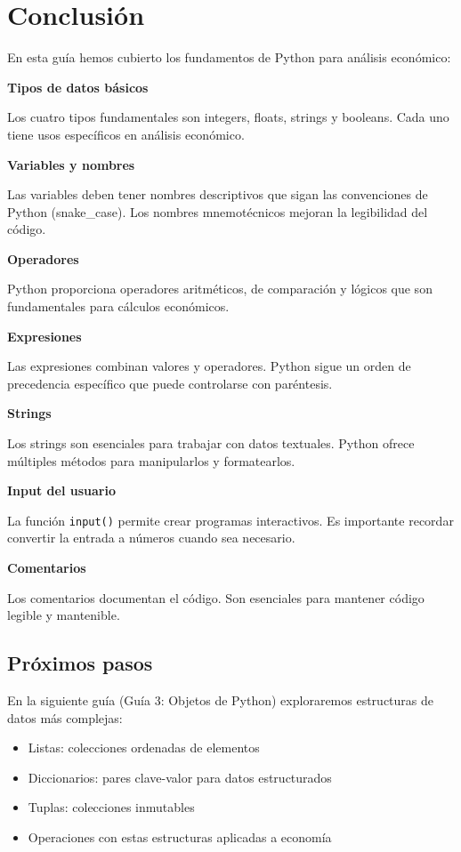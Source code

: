 \documentclass[
  doc,
  floatsintext,
  longtable,
  a4paper,
  nolmodern,
  notxfonts,
  notimes,
  12pt,
  colorlinks=true,linkcolor=blue,citecolor=blue,urlcolor=blue]{apa7}
\providecommand{\tightlist}{%
  \setlength{\itemsep}{0pt}\setlength{\parskip}{0pt}}
\begin{document}
\section{Conclusión}\label{conclusiuxf3n}

En esta guía hemos cubierto los fundamentos de Python para análisis
económico:

\textbf{Tipos de datos básicos}

Los cuatro tipos fundamentales son integers, floats, strings y booleans.
Cada uno tiene usos específicos en análisis económico.

\textbf{Variables y nombres}

Las variables deben tener nombres descriptivos que sigan las
convenciones de Python (snake\_case). Los nombres mnemotécnicos mejoran
la legibilidad del código.

\textbf{Operadores}

Python proporciona operadores aritméticos, de comparación y lógicos que
son fundamentales para cálculos económicos.

\textbf{Expresiones}

Las expresiones combinan valores y operadores. Python sigue un orden de
precedencia específico que puede controlarse con paréntesis.

\textbf{Strings}

Los strings son esenciales para trabajar con datos textuales. Python
ofrece múltiples métodos para manipularlos y formatearlos.

\textbf{Input del usuario}

La función \texttt{input()} permite crear programas interactivos. Es
importante recordar convertir la entrada a números cuando sea necesario.

\textbf{Comentarios}

Los comentarios documentan el código. Son esenciales para mantener
código legible y mantenible.

\subsection{Próximos pasos}\label{pruxf3ximos-pasos}

En la siguiente guía (Guía 3: Objetos de Python) exploraremos
estructuras de datos más complejas:

\begin{itemize}
\tightlist
\item
  Listas: colecciones ordenadas de elementos
\item
  Diccionarios: pares clave-valor para datos estructurados
\item
  Tuplas: colecciones inmutables
\item
  Operaciones con estas estructuras aplicadas a economía
\end{itemize}
\end{document}
